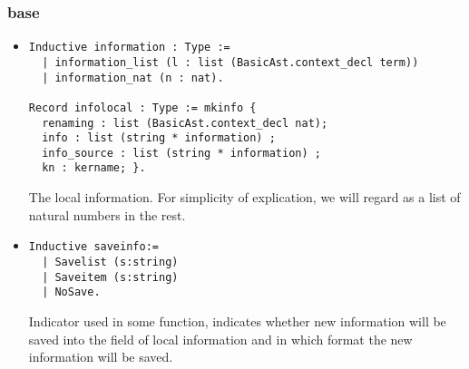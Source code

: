 \documentclass[a4paper,UKenglish,cleveref, autoref, thm-restate]{lipics-v2021}
\begin{document}
\subsubsection{base}
\begin{itemize}

\item
\begin{lstlisting}[language = {Coq}, basicstyle = \small]
Inductive information : Type :=
  | information_list (l : list (BasicAst.context_decl term))
  | information_nat (n : nat).

Record infolocal : Type := mkinfo {
  renaming : list (BasicAst.context_decl nat);
  info : list (string * information) ;
  info_source : list (string * information) ;
  kn : kername; }.    
\end{lstlisting}
The local information. For simplicity of explication, we will regard  as a list of natural numbers in the rest.






\item
\begin{lstlisting}[language = {Coq}, basicstyle = \small]
Inductive saveinfo:=
  | Savelist (s:string)
  | Saveitem (s:string)
  | NoSave.
\end{lstlisting}
Indicator used in some function, indicates whether new information will be saved into the  field of local information and in which format the new information will be saved. 





\end{itemize}
\end{document}
